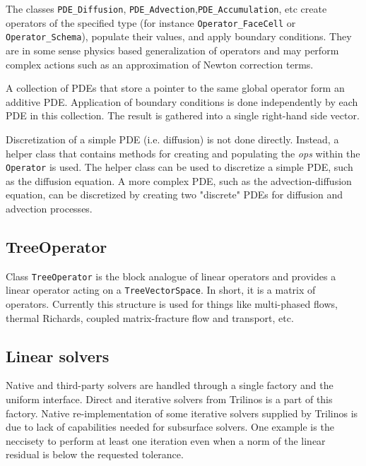 {The classes {\tt PDE\_Diffusion}, {\tt PDE\_Advection},{\tt PDE\_Accumulation}, etc create 
operators of the specified type (for instance 
{\tt Operator\_FaceCell} or {\tt Operator\_Schema}), populate their values, and
apply boundary conditions.
They are in some sense physics based generalization of operators and may perform complex actions
such as an approximation of Newton correction terms.

A collection of PDEs that store a pointer to the same global operator form an additive PDE.
Application of boundary conditions is done independently by each PDE in this collection.
The result is gathered into a single right-hand side vector.


Discretization of a simple 
PDE (i.e. diffusion) is not done directly. 
Instead, a helper class that contains methods for creating and populating 
the {\it ops} within the {\tt Operator} is used. 
The helper class can be used to discretize a simple PDE, such as the diffusion equation.
A more complex PDE, such as the advection-diffusion equation, can be discretized 
by creating two "discrete" PDEs for diffusion and advection processes.


\subsection{TreeOperator}
Class {\tt TreeOperator} is the block analogue of linear operators and 
provides a linear operator acting on a {\tt TreeVectorSpace}. 
In short, it is a matrix of operators.
Currently this structure is used for things like multi-phased flows, 
thermal Richards, coupled matrix-fracture flow and transport, etc.


\subsection{Linear solvers}
Native and third-party solvers are handled through a single factory and 
the uniform interface.
Direct and iterative solvers from Trilinos is a part of this factory.
Native re-implementation of some iterative solvers supplied by Trilinos
is due to lack of capabilities needed for subsurface solvers.
One example is the neccisety to perform at least one iteration even when
a norm of the linear residual is below the requested tolerance.


}

